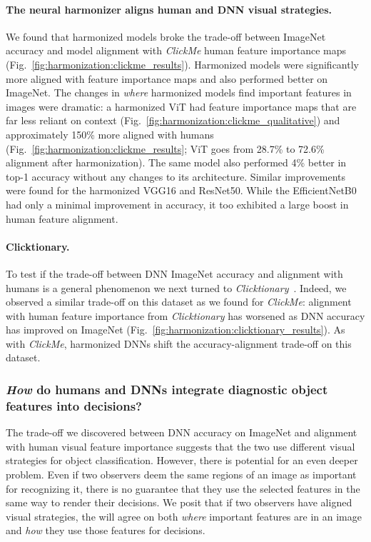 \paragraph{The neural harmonizer aligns human and DNN visual strategies.} We found that harmonized models broke the trade-off between ImageNet accuracy and model alignment with \textit{ClickMe} human feature importance maps (Fig.~\ref{fig:harmonization:clickme_results}). Harmonized models were significantly more aligned with feature importance maps and also performed better on ImageNet. The changes in \textit{where} harmonized models find important features in images were dramatic: a harmonized ViT had feature importance maps that are far less reliant on context (Fig.~\ref{fig:harmonization:clickme_qualitative}) and approximately 150\% more aligned with humans (Fig.~\ref{fig:harmonization:clickme_results}; ViT goes from 28.7\% to 72.6\% alignment after harmonization). The same model also performed 4\% better in top-1 accuracy without any changes to its architecture. Similar improvements were found for the harmonized VGG16 and ResNet50. While the EfficientNetB0 had only a minimal improvement in accuracy, it too exhibited a large boost in human feature alignment.

\paragraph{Clicktionary.} To test if the trade-off between DNN ImageNet accuracy and alignment with humans is a general phenomenon we next turned to \textit{Clicktionary}~\cite{Linsley2017-qe}. Indeed, we observed a similar trade-off on this dataset as we found for \textit{ClickMe}: alignment with human feature importance from \textit{Clicktionary} has worsened as DNN accuracy has improved on ImageNet (Fig.~\ref{fig:harmonization:clicktionary_results}). As with \textit{ClickMe}, harmonized DNNs shift the accuracy-alignment trade-off on this dataset.

\subsubsection{\textit{How} do humans and DNNs integrate diagnostic object features into decisions?}
The trade-off we discovered between DNN accuracy on ImageNet and alignment with human visual feature importance suggests that the two use different visual strategies for object classification. However, there is potential for an even deeper problem. Even if two observers deem the same regions of an image as important for recognizing it, there is no guarantee that they use the selected features in the same way to render their decisions. We posit that if two observers have aligned visual strategies, the will agree on both \textit{where} important features are in an image and \textit{how} they use those features for decisions.

